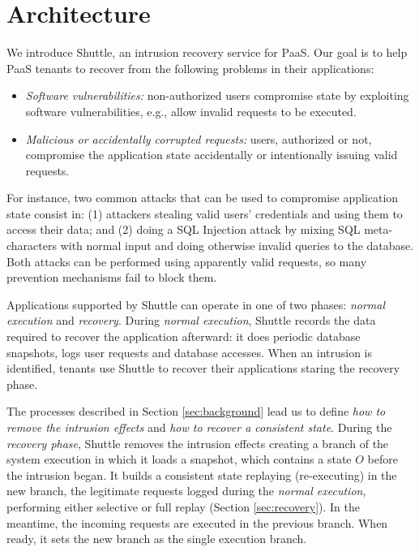 
\section{Architecture}
\label{sec:architecture}

We introduce Shuttle, an intrusion recovery service for \ac{PaaS}. Our goal is to help \ac{PaaS} tenants to recover from the following problems in their applications:
\begin{itemize}
  \item \textit{Software vulnerabilities:} non-authorized users compromise state by exploiting software vulnerabilities, e.g., allow invalid requests to be executed.
  \item \textit{Malicious or accidentally corrupted requests:} users, authorized or not, compromise the application state accidentally or intentionally issuing valid requests.
\end{itemize} 

For instance, two common attacks that can be used to compromise application state consist in: (1) attackers stealing valid users' credentials and using them to access their data; and (2) doing a SQL Injection attack by mixing SQL meta-characters with normal input and doing otherwise invalid queries to the database. Both attacks can be performed using apparently valid requests, so many prevention mechanisms fail to block them.

Applications supported by Shuttle can operate in one of two phases: \textit{normal execution} and \textit{recovery}. During \emph{normal execution}, Shuttle records the data required to recover the application afterward: it does periodic database snapshots, logs  user requests and database accesses. When an intrusion is identified, tenants use Shuttle to recover their applications staring the recovery phase.

The processes described in Section \ref{sec:background} lead us to define \textit{how to remove the intrusion effects} and \textit{how to recover a consistent state}. During the \emph{recovery phase}, Shuttle removes the intrusion effects creating a branch of the system execution in which it loads a snapshot, which contains a state $O$ before the intrusion began. It builds a consistent state replaying (re-executing) in the new branch, the legitimate requests logged during the \emph{normal execution}, performing either selective or full replay (Section \ref{sec:recovery}). In the meantime, the incoming requests are executed in the previous branch. When ready, it sets the new branch as the single execution branch.\\

